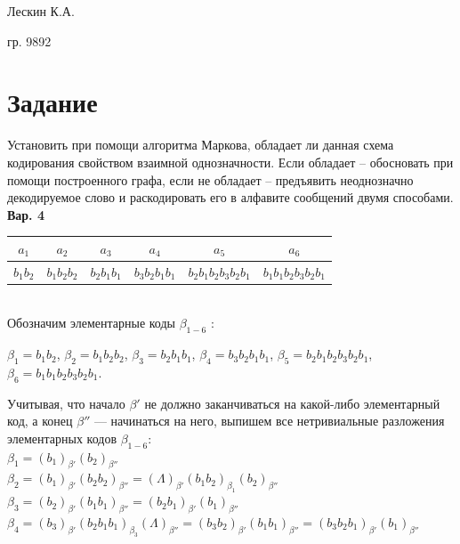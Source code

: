 Лескин К.А.

гр. 9892

\section*{Задание}

Установить при помощи алгоритма Маркова, обладает ли данная схема кодирования свойством взаимной однозначности. Если обладает – обосновать при помощи построенного графа, если не обладает – предъявить неоднозначно декодируемое слово и раскодировать его в алфавите сообщений двумя способами. 
\\

\textbf{Вар. 4}

\begin{tabular}{|c|c|c|c|c|c|}
    \hline
    $ a_1 $ & $ a_2 $ & $ a_3 $ & $ a_4 $ & $ a_5 $ & $ a_6 $\\
    \hline
    $ b_1b_2 $ & 
    $ b_1b_2b_2 $ & 
    $ b_2b_1b_1 $ & 
    $ b_3b_2b_1b_1 $ & 
    $ b_2b_1b_2b_3b_2b_1 $ & 
    $ b_1b_1b_2b_3b_2b_1 $\\
    \hline
\end{tabular}

\ 
\\

Обозначим элементарные коды $ \beta_{1-6} $ :

$ \beta_1 = b_1b_2 $,
$ \beta_2 = b_1b_2b_2 $,
$ \beta_3 = b_2b_1b_1 $,
$ \beta_4 = b_3b_2b_1b_1 $,
$ \beta_5 = b_2b_1b_2b_3b_2b_1 $,
$ \beta_6 = b_1b_1b_2b_3b_2b_1 $.

Учитывая, что начало $ \beta' $ не должно заканчиваться на какой-либо элементарный код, а конец $ \beta'' $ --- начинаться на него,
выпишем все нетривиальные разложения элементарных кодов $ \beta_{1-6} $:\\

$ 
\beta_1 = 
(b_1)_{\beta'}(b_2)_{\beta''} 
$
\\

$ 
\beta_2 = 
(b_1)_{\beta'}(b_2b_2)_{\beta''} = (\Lambda)_{\beta'}(b_1b_2)_{\beta_1}(b_2)_{\beta''}
$
\\

$ 
\beta_3 = 
(b_2)_{\beta'}(b_1b_1)_{\beta''} = 
(b_2b_1)_{\beta'}(b_1)_{\beta''} 
$
\\
 
$ 
\beta_4 = 
(b_3)_{\beta'}(b_2b_1b_1)_{\beta_3}(\Lambda)_{\beta''} = 
(b_3b_2)_{\beta'}(b_1b_1)_{\beta''} = 
(b_3b_2b_1)_{\beta'}(b_1)_{\beta''}
$
\\


